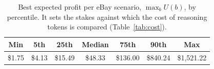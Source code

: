 \begin{table}[h!]
\caption{Best expected profit per eBay scenario, $\max_b U(b)$, by percentile. It sets the stakes against which the cost of reasoning tokens is compared (Table~\ref{tab:cost}).}
\label{tab:ustar}
\footnotesize
\centering

\begin{tabular}{ccccccc}
\toprule
Min & 5th & 25th & Median & 75th & 90th & Max \\
\midrule
\$1.75 & \$4.13 & \$15.49 & \$48.33 & \$136.00 & \$840.24 & \$1,521.22 \\
\bottomrule
\end{tabular}
\end{table}
